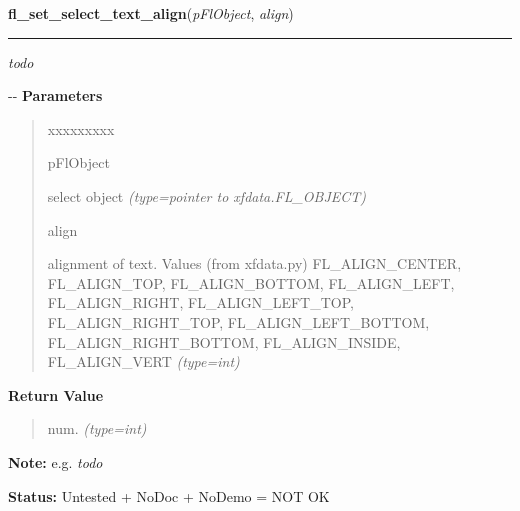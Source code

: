 \hspace{.8\funcindent}\begin{boxedminipage}{\funcwidth}

    \raggedright \textbf{fl\_set\_select\_text\_align}(\textit{pFlObject}, \textit{align})

    \vspace{-1.5ex}

    \rule{\textwidth}{0.5\fboxrule}
\setlength{\parskip}{2ex}

\emph{todo}

-{}-
\setlength{\parskip}{1ex}
      \textbf{Parameters}
      \vspace{-1ex}

      \begin{quote}
        \begin{Ventry}{xxxxxxxxx}

          \item[pFlObject]


select object
            {\it (type=pointer to xfdata.FL\_OBJECT)}

          \item[align]


alignment of text. Values (from xfdata.py) FL\_ALIGN\_CENTER,
FL\_ALIGN\_TOP, FL\_ALIGN\_BOTTOM, FL\_ALIGN\_LEFT, FL\_ALIGN\_RIGHT,
FL\_ALIGN\_LEFT\_TOP, FL\_ALIGN\_RIGHT\_TOP, FL\_ALIGN\_LEFT\_BOTTOM,
FL\_ALIGN\_RIGHT\_BOTTOM, FL\_ALIGN\_INSIDE, FL\_ALIGN\_VERT
            {\it (type=int)}

        \end{Ventry}

      \end{quote}

      \textbf{Return Value}
    \vspace{-1ex}

      \begin{quote}

num.
      {\it (type=int)}

      \end{quote}

\textbf{Note:} 
e.g. \emph{todo}


\textbf{Status:} 
Untested + NoDoc + NoDemo = NOT OK


    \end{boxedminipage}

    \label{xformslib:flselect:fl_set_select_policy}

